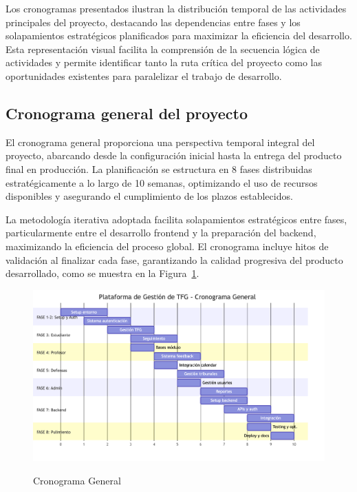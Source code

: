 \documentclass[12pt,a4paper,oneside]{report}
\providecommand{\pandocbounded}[1]{#1}
\begin{document}
Los cronogramas presentados ilustran la distribución temporal de las actividades principales del proyecto, destacando las dependencias entre fases y los solapamientos estratégicos planificados para maximizar la eficiencia del desarrollo. Esta representación visual facilita la comprensión de la secuencia lógica de actividades y permite identificar tanto la ruta crítica del proyecto como las oportunidades existentes para paralelizar el trabajo de desarrollo.

\subsection{Cronograma general del
proyecto}\label{cronograma-general-del-proyecto}

El cronograma general proporciona una perspectiva temporal integral del proyecto, abarcando desde la configuración inicial hasta la entrega del producto final en producción. La planificación se estructura en 8 fases distribuidas estratégicamente a lo largo de 10 semanas, optimizando el uso de recursos disponibles y asegurando el cumplimiento de los plazos establecidos.

La metodología iterativa adoptada facilita solapamientos estratégicos entre fases, particularmente entre el desarrollo frontend y la preparación del backend, maximizando la eficiencia del proceso global. El cronograma incluye hitos de validación al finalizar cada fase, garantizando la calidad progresiva del producto desarrollado, como se muestra en la Figura~\ref{fig:cronograma-general}.

\begin{figure}[H]
\centering
\pandocbounded{\includegraphics[keepaspectratio,alt={Cronograma General}]{processed/images/03_planificacion_mermaid_0.png}}
\caption{Cronograma General}
\label{fig:cronograma-general}
\end{figure}
\end{document}
